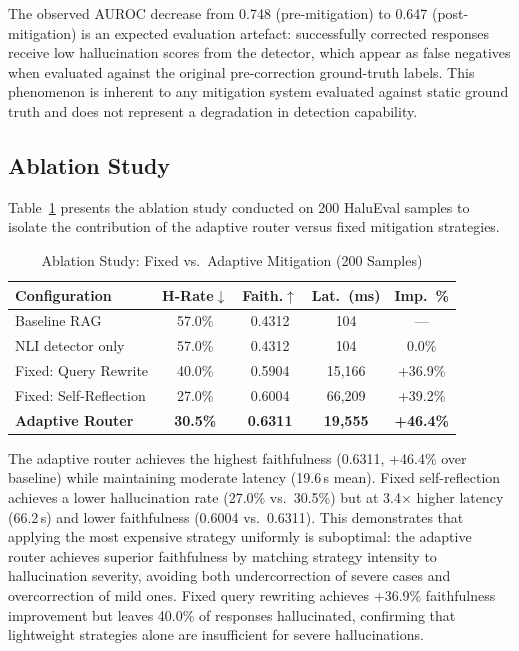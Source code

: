 \documentclass[conference]{IEEEtran}
\begin{document}
The observed AUROC decrease from 0.748 (pre-mitigation) to 0.647 (post-mitigation) is an expected evaluation artefact: successfully corrected responses receive low hallucination scores from the detector, which appear as false negatives when evaluated against the original pre-correction ground-truth labels. This phenomenon is inherent to any mitigation system evaluated against static ground truth and does not represent a degradation in detection capability.

\subsection{Ablation Study}

Table~\ref{tab:ablation} presents the ablation study conducted on 200 HaluEval samples to isolate the contribution of the adaptive router versus fixed mitigation strategies.

\begin{table}[t]
\centering
\caption{Ablation Study: Fixed vs.\ Adaptive Mitigation (200 Samples)}
\label{tab:ablation}
\begin{tabular}{@{}lcccc@{}}
\toprule
\textbf{Configuration} & \textbf{H-Rate}$\downarrow$ & \textbf{Faith.}$\uparrow$ & \textbf{Lat.\ (ms)} & \textbf{Imp.\ \%} \\
\midrule
Baseline RAG & 57.0\% & 0.4312 & 104 & --- \\
NLI detector only & 57.0\% & 0.4312 & 104 & 0.0\% \\
\midrule
Fixed: Query Rewrite & 40.0\% & 0.5904 & 15{,}166 & +36.9\% \\
Fixed: Self-Reflection & 27.0\% & 0.6004 & 66{,}209 & +39.2\% \\
\midrule
\textbf{Adaptive Router} & \textbf{30.5\%} & \textbf{0.6311} & \textbf{19{,}555} & \textbf{+46.4\%} \\
\bottomrule
\end{tabular}
\end{table}

The adaptive router achieves the highest faithfulness (0.6311, +46.4\% over baseline) while maintaining moderate latency (19.6\,s mean). Fixed self-reflection achieves a lower hallucination rate (27.0\% vs.\ 30.5\%) but at 3.4$\times$ higher latency (66.2\,s) and lower faithfulness (0.6004 vs.\ 0.6311). This demonstrates that applying the most expensive strategy uniformly is suboptimal: the adaptive router achieves superior faithfulness by matching strategy intensity to hallucination severity, avoiding both undercorrection of severe cases and overcorrection of mild ones. Fixed query rewriting achieves +36.9\% faithfulness improvement but leaves 40.0\% of responses hallucinated, confirming that lightweight strategies alone are insufficient for severe hallucinations.
\end{document}
